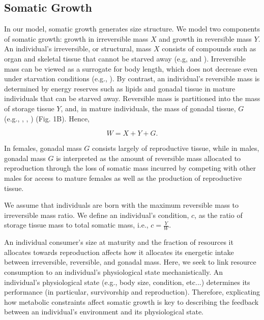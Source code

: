 \documentclass[11pt]{article}
\begin{document}
\begin{linenumbers}
\subsection*{Somatic Growth}
In our model, somatic growth generates size structure. We model two components of somatic growth: growth in irreversible mass $X$ and growth in reversible mass $Y$. An individual's irreversible, or structural, mass $X$ consists of compounds such as organ and skeletal tissue that cannot be starved away (e.g, \citealt{broekhuizen94} and \citealt{deroos01}). Irreversible mass can be viewed as a surrogate for body length, which does not decrease even under starvation conditions (e.g., \citealt{broekhuizen94}). By contrast, an individual's reversible mass is determined by energy reserves such as lipids and gonadal tissue in mature individuals that can be starved away. Reversible mass is partitioned into the mass of storage tissue $Y$, and, in mature individuals, the mass of gonadal tissue, $G$ (e.g., \citealt{broekhuizen94}, \citealt{persson98}, \citealt{deroos01}) (Fig. 1B). Hence,
\begin{linenomath}
\begin{equation}
W = X + Y + G.
\end{equation}
\end{linenomath}
In females, gonadal mass $G$ consists largely of reproductive tissue, while in males, gonadal mass $G$ is interpreted as the amount of reversible mass allocated to reproduction through the loss of somatic mass incurred by competing with other males for access to mature females as well as the production of reproductive tissue.

We assume that individuals are born with the maximum reversible mass to irreversible mass ratio. We define an individual's condition, $c$, as the ratio of storage tissue mass to total somatic mass, i.e., $c=\frac{Y}{W}$. 

An individual consumer's size at maturity and the fraction of resources it allocates towards reproduction affects how it allocates its energetic intake between irreversible, reversible, and gonadal mass. Here, we seek to link resource consumption to an individual's physiological state mechanistically. An individual's physiological state (e.g., body size, condition, etc...) determines its performance (in particular, survivorship and reproduction). Therefore, explicating how metabolic constraints affect somatic growth is key to describing the feedback between an individual's environment and its physiological state.


\end{linenumbers}
\end{document}
